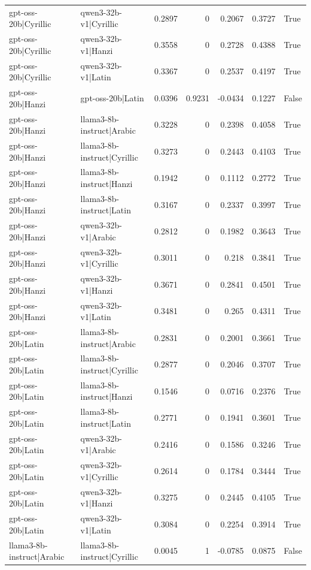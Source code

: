 \begin{table}
\begin{tabular}{l l r r r r l}
gpt-oss-20b|Cyrillic & qwen3-32b-v1|Cyrillic & 0.2897 & 0 & 0.2067 & 0.3727 & True \\
gpt-oss-20b|Cyrillic & qwen3-32b-v1|Hanzi & 0.3558 & 0 & 0.2728 & 0.4388 & True \\
gpt-oss-20b|Cyrillic & qwen3-32b-v1|Latin & 0.3367 & 0 & 0.2537 & 0.4197 & True \\
gpt-oss-20b|Hanzi & gpt-oss-20b|Latin & 0.0396 & 0.9231 & -0.0434 & 0.1227 & False \\
gpt-oss-20b|Hanzi & llama3-8b-instruct|Arabic & 0.3228 & 0 & 0.2398 & 0.4058 & True \\
gpt-oss-20b|Hanzi & llama3-8b-instruct|Cyrillic & 0.3273 & 0 & 0.2443 & 0.4103 & True \\
gpt-oss-20b|Hanzi & llama3-8b-instruct|Hanzi & 0.1942 & 0 & 0.1112 & 0.2772 & True \\
gpt-oss-20b|Hanzi & llama3-8b-instruct|Latin & 0.3167 & 0 & 0.2337 & 0.3997 & True \\
gpt-oss-20b|Hanzi & qwen3-32b-v1|Arabic & 0.2812 & 0 & 0.1982 & 0.3643 & True \\
gpt-oss-20b|Hanzi & qwen3-32b-v1|Cyrillic & 0.3011 & 0 & 0.218 & 0.3841 & True \\
gpt-oss-20b|Hanzi & qwen3-32b-v1|Hanzi & 0.3671 & 0 & 0.2841 & 0.4501 & True \\
gpt-oss-20b|Hanzi & qwen3-32b-v1|Latin & 0.3481 & 0 & 0.265 & 0.4311 & True \\
gpt-oss-20b|Latin & llama3-8b-instruct|Arabic & 0.2831 & 0 & 0.2001 & 0.3661 & True \\
gpt-oss-20b|Latin & llama3-8b-instruct|Cyrillic & 0.2877 & 0 & 0.2046 & 0.3707 & True \\
gpt-oss-20b|Latin & llama3-8b-instruct|Hanzi & 0.1546 & 0 & 0.0716 & 0.2376 & True \\
gpt-oss-20b|Latin & llama3-8b-instruct|Latin & 0.2771 & 0 & 0.1941 & 0.3601 & True \\
gpt-oss-20b|Latin & qwen3-32b-v1|Arabic & 0.2416 & 0 & 0.1586 & 0.3246 & True \\
gpt-oss-20b|Latin & qwen3-32b-v1|Cyrillic & 0.2614 & 0 & 0.1784 & 0.3444 & True \\
gpt-oss-20b|Latin & qwen3-32b-v1|Hanzi & 0.3275 & 0 & 0.2445 & 0.4105 & True \\
gpt-oss-20b|Latin & qwen3-32b-v1|Latin & 0.3084 & 0 & 0.2254 & 0.3914 & True \\
llama3-8b-instruct|Arabic & llama3-8b-instruct|Cyrillic & 0.0045 & 1 & -0.0785 & 0.0875 & False \\

\end{tabular}
\end{table}
